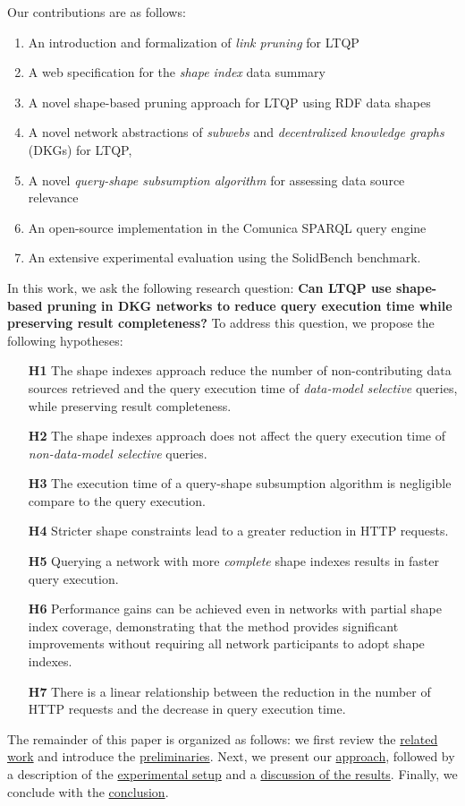 Our contributions are as follows:
\begin{enumerate}[label=(\roman*)]
    \item An introduction and formalization of \emph{link pruning} for LTQP 
    \item A web specification for the \emph{shape index} data summary
    \item A novel shape-based pruning approach for LTQP using RDF data shapes
    \item A novel network abstractions of \emph{subwebs} and \emph{decentralized knowledge graphs} (DKGs) for LTQP,
    \item A novel \emph{query-shape subsumption algorithm} for assessing data source relevance
    \item An open-source implementation in the Comunica SPARQL query engine~\cite{taelman_iswc_resources_comunica_2018}
    \item An extensive experimental evaluation using the SolidBench benchmark.
\end{enumerate}

In this work, we ask the following research question: 
\textbf{Can LTQP use shape-based pruning in DKG networks to reduce query execution time while preserving result completeness?}
To address this question, we propose the following hypotheses:  

\begin{itemize}
    \item[\textbf{H1}] The shape indexes approach reduce the number of non-contributing data sources retrieved and the query execution time of \emph{data-model selective} queries, while preserving result completeness.
    \item[\textbf{H2}] The shape indexes approach does not affect the query execution time of \emph{non-data-model selective} queries.
    \item[\textbf{H3}] The execution time of a query-shape subsumption algorithm is negligible compare to the query execution.
    \item[\textbf{H4}] Stricter shape constraints lead to a greater reduction in HTTP requests.
    \item[\textbf{H5}] Querying a network with more \emph{complete} shape indexes results in faster query execution.
    \item[\textbf{H6}] Performance gains can be achieved even in networks with partial shape index coverage, demonstrating that the method provides significant improvements without requiring all network participants to adopt shape indexes.
    \item[\textbf{H7}] There is a linear relationship between the reduction in the number of HTTP requests and the decrease in query execution time.
\end{itemize}

The remainder of this paper is organized as follows: 
we first review the \hyperref[sec:related_work]{related work} and introduce the \hyperref[sec:preliminaries]{preliminaries}. 
Next, we present our \hyperref[sec:approach]{approach}, followed by a description of the \hyperref[sec:experiment]{experimental setup} and a \hyperref[sec:result]{discussion of the results}. 
Finally, we conclude with the \hyperref[sec:conclusion]{conclusion}.
